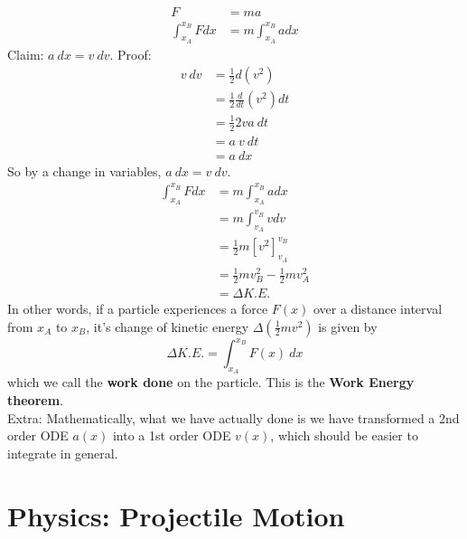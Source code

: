 \documentclass{article}
\begin{document}
\begin{align}
    F &= ma \\
    \int_{x_A}^{x_B} F dx &= m \int_{x_A}^{x_B} a dx 
\end{align}
Claim: $a\ dx = v\ dv$. Proof: 
\begin{align}
v\ dv
& = \frac{1}{2} d\left(v^2\right) \\
& =\frac{1}{2} \frac{d}{d t}\left(v^2\right) d t \\
& =\frac{1}{2} 2 v a\ d t \\
& =a\ v\ d t \\
& =a \ d x
\end{align}
So by a change in variables, $a\ dx = v\ dv$. 
\begin{align}
    \int_{x_A}^{x_B} F dx &= m \int_{x_A}^{x_B} a dx \\
    &= m \int_{v_A}^{v_B} v dv \\
    &= \frac{1}{2} m \left[v^2\right]_{v_A}^{v_B} \\
    &= \frac{1}{2} m v_B^2 - \frac{1}{2} mv_A^2 \\
    &= \Delta K.E.
\end{align}
In other words, if a particle experiences a force $F(x)$ over a distance interval from $x_A$ to $x_B$, it's change of kinetic energy $\Delta\left(\frac{1}{2}mv^2\right)$ is given by $$\Delta K.E. = \int_{x_A}^{x_B} F(x)\ dx$$
which we call the \textbf{work done} on the particle. This is the \textbf{Work Energy theorem}.\\[10pt]
Extra: Mathematically, what we have actually done is we have transformed a 2nd order ODE $a(x)$ into a 1st order ODE $v(x)$, which should be easier to integrate in general.

\section{Physics: Projectile Motion}
\end{document}
